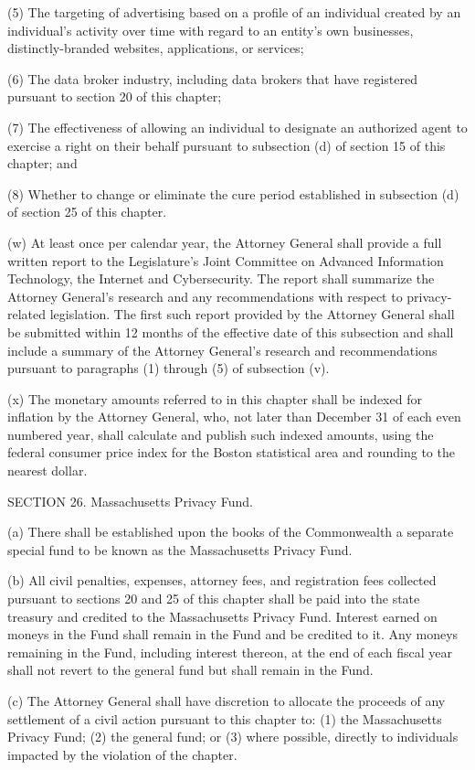 (5) The targeting of advertising based on a profile of an individual created by an individual’s activity over time with regard to an entity’s own businesses, distinctly-branded websites, applications, or services;

(6) The data broker industry, including data brokers that have registered pursuant to section 20 of this chapter;

(7) The effectiveness of allowing an individual to designate an authorized agent to exercise a right on their behalf pursuant to subsection (d) of section 15 of this chapter; and

(8) Whether to change or eliminate the cure period established in subsection (d) of section 25 of this chapter.

(w) At least once per calendar year, the Attorney General shall provide a full written report to the Legislature’s Joint Committee on Advanced Information Technology, the Internet and Cybersecurity. The report shall summarize the Attorney General’s research and any recommendations with respect to privacy-related legislation. The first such report provided by the Attorney General shall be submitted within 12 months of the effective date of this subsection and shall include a summary of the Attorney General’s research and recommendations pursuant to paragraphs (1) through (5) of subsection (v).

(x) The monetary amounts referred to in this chapter shall be indexed for inflation by the Attorney General, who, not later than December 31 of each even numbered year, shall calculate and publish such indexed amounts, using the federal consumer price index for the Boston statistical area and rounding to the nearest dollar. 

SECTION 26. Massachusetts Privacy Fund.

(a) There shall be established upon the books of the Commonwealth a separate special fund to be known as the Massachusetts Privacy Fund.

(b) All civil penalties, expenses, attorney fees, and registration fees collected pursuant to sections 20 and 25 of this chapter shall be paid into the state treasury and credited to the Massachusetts Privacy Fund. Interest earned on moneys in the Fund shall remain in the Fund and be credited to it. Any moneys remaining in the Fund, including interest thereon, at the end of each fiscal year shall not revert to the general fund but shall remain in the Fund.

(c) The Attorney General shall have discretion to allocate the proceeds of any settlement of a civil action pursuant to this chapter to: (1) the Massachusetts Privacy Fund; (2) the general fund; or (3) where possible, directly to individuals impacted by the violation of the chapter. 

